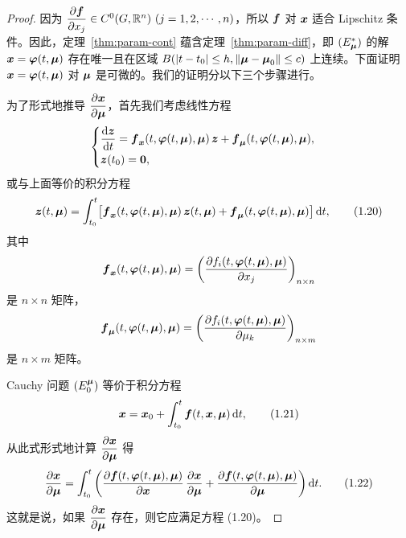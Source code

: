 \begin{proof}
	因为 $\dfrac{\partial \boldsymbol{f}}{\partial x_j} \in C^0(G, \mathbb{R}^n)\ (j = 1, 2, \cdots, n)$，所以 $\boldsymbol{f}$ 对 $\boldsymbol{x}$ 适合 Lipschitz 条件。因此，定理~\ref{thm:param-cont} 蕴含定理~\ref{thm:param-diff}，即 $(E_{\boldsymbol{\mu}}^*)$ 的解 $\boldsymbol{x} = \boldsymbol{\varphi}(t, \boldsymbol{\mu})$ 存在唯一且在区域 $B(|t - t_0| \leq h, \|\boldsymbol{\mu} - \boldsymbol{\mu}_0\| \leq c)$ 上连续。下面证明 $\boldsymbol{x} = \boldsymbol{\varphi}(t, \boldsymbol{\mu})$ 对 $\boldsymbol{\mu}$ 是可微的。我们的证明分以下三个步骤进行。

	为了形式地推导 $\dfrac{\partial \boldsymbol{x}}{\partial \boldsymbol{\mu}}$，首先我们考虑线性方程
	\[
		\begin{cases}
			\dfrac{\mathrm{d} \boldsymbol{z}}{\mathrm{d} t} 
			= \boldsymbol{f}_{\boldsymbol{x}}(t, \boldsymbol{\varphi}(t, \boldsymbol{\mu}), \boldsymbol{\mu})\,\boldsymbol{z} 
			+ \boldsymbol{f}_{\boldsymbol{\mu}}(t, \boldsymbol{\varphi}(t, \boldsymbol{\mu}), \boldsymbol{\mu}), \\[4pt]
			\boldsymbol{z}(t_0) = \boldsymbol{0},
		\end{cases}
	\]
	或与上面等价的积分方程
	\[
		\boldsymbol{z}(t, \boldsymbol{\mu}) 
		= \int_{t_0}^t \bigl[\boldsymbol{f}_{\boldsymbol{x}}(t, \boldsymbol{\varphi}(t, \boldsymbol{\mu}), \boldsymbol{\mu})\,\boldsymbol{z}(t, \boldsymbol{\mu})
		+ \boldsymbol{f}_{\boldsymbol{\mu}}(t, \boldsymbol{\varphi}(t, \boldsymbol{\mu}), \boldsymbol{\mu})\bigr]\,\mathrm{d} t,
		\tag{1.20}
	\]
	其中
	\[
		\boldsymbol{f}_{\boldsymbol{x}}(t, \boldsymbol{\varphi}(t, \boldsymbol{\mu}), \boldsymbol{\mu}) 
		= \left(\frac{\partial f_i(t, \boldsymbol{\varphi}(t, \boldsymbol{\mu}), \boldsymbol{\mu})}{\partial x_j}\right)_{n \times n}
	\]
	是 $n \times n$ 矩阵，
	\[
		\boldsymbol{f}_{\boldsymbol{\mu}}(t, \boldsymbol{\varphi}(t, \boldsymbol{\mu}), \boldsymbol{\mu}) 
		= \left(\frac{\partial f_i(t, \boldsymbol{\varphi}(t, \boldsymbol{\mu}), \boldsymbol{\mu})}{\partial \mu_k}\right)_{n \times m}
	\]
	是 $n \times m$ 矩阵。

	Cauchy 问题 $(E_0^{\boldsymbol{\mu}})$ 等价于积分方程
	\[
		\boldsymbol{x} = \boldsymbol{x}_0 + \int_{t_0}^t \boldsymbol{f}(t, \boldsymbol{x}, \boldsymbol{\mu})\,\mathrm{d} t,
		\tag{1.21}
	\]
	从此式形式地计算 $\dfrac{\partial \boldsymbol{x}}{\partial \boldsymbol{\mu}}$ 得
	\[
		\frac{\partial \boldsymbol{x}}{\partial \boldsymbol{\mu}} 
		= \int_{t_0}^t \left(\frac{\partial \boldsymbol{f}(t, \boldsymbol{\varphi}(t, \boldsymbol{\mu}), \boldsymbol{\mu})}{\partial \boldsymbol{x}}\,\frac{\partial \boldsymbol{x}}{\partial \boldsymbol{\mu}}
		+ \frac{\partial \boldsymbol{f}(t, \boldsymbol{\varphi}(t, \boldsymbol{\mu}), \boldsymbol{\mu})}{\partial \boldsymbol{\mu}}\right)\mathrm{d} t.
		\tag{1.22}
	\]
	这就是说，如果 $\dfrac{\partial \boldsymbol{x}}{\partial \boldsymbol{\mu}}$ 存在，则它应满足方程 (1.20)。


\end{proof}
